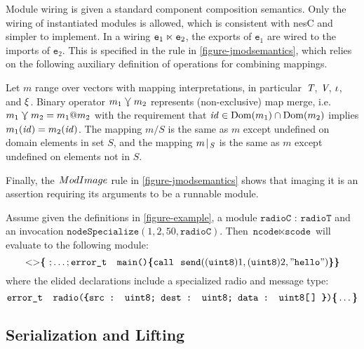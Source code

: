 Module wiring is given a standard component composition semantics. Only the wiring of
instantiated modules is allowed, which is consistent with nesC and simpler to implement. In a
wiring $\texttt{e}_1 \ltimes \texttt{e}_2$, the exports of $\texttt{e}_1$ are wired to the
imports of $\texttt{e}_2$. This is specified in the  rule in
\autoref{figure-jmodsemantics}, which relies on the following auxiliary definition of operations
for combining mappings.
\begin{definition}
  Let $m$ range over vectors with mapping interpretations, in particular~$\textit{T}$, $\textit{V}$,
  $\iota$, and $\xi$. Binary operator $m_1\curlyveedownarrow m_2$ represents (non-exclusive)
  map merge, i.e.~$m_1 \curlyveedownarrow m_2 = m_1 @ m_2$ with the requirement that $\mathit{id}\in
  {\rm Dom}(m_1)\cap{\rm Dom}(m_2)$ implies $m_1(\mathit{id}) = m_2(\mathit{id})$. The mapping $m / S$ is
  the same as $m$ except undefined on domain elements in set $S$, and the mapping
  $m\!\mid\!_{S}$ is the same as $m$ except undefined on elements not in ${S}$.
\end{definition}
Finally, the $\TirName{ModImage}$ rule in \autoref{figure-jmodsemantics} shows that imaging it
is an assertion requiring its arguments to be a runnable module.

\begin{example}
\label{example-scalanesssemantics}
Assume given the definitions in \autoref{figure-example}, a module $\texttt{radioC : radioT}$
and an invocation $\texttt{nodeSpecialize}(1,2,50,\texttt{radioC})$. Then $\texttt{ncode}
\ltimes \texttt{scode}$ will evaluate to the following module:
$$
\margs{}\lc\ ; \ldots; \texttt{error\_t\ \ main()} \lc \texttt{call}\ \ \texttt{send}((\texttt{uint8})1, (\texttt{uint8})2, "\texttt{hello}") \rc\rc
$$  
where the elided declarations include a specialized radio and message type:
$$
\texttt{error\_t\ \ radio(\lc \texttt{src : uint8}; \texttt{dest : uint8}; \texttt{data : uint8[\,]} \rc)} \lc \ldots \rc
$$
\end{example}

\subsection{Serialization and Lifting}
\label{section-serialization}

